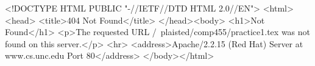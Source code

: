 <!DOCTYPE HTML PUBLIC "-//IETF//DTD HTML 2.0//EN">
<html><head>
<title>404 Not Found</title>
</head><body>
<h1>Not Found</h1>
<p>The requested URL /~plaisted/comp455/practice1.tex was not found on this server.</p>
<hr>
<address>Apache/2.2.15 (Red Hat) Server at www.cs.unc.edu Port 80</address>
</body></html>
